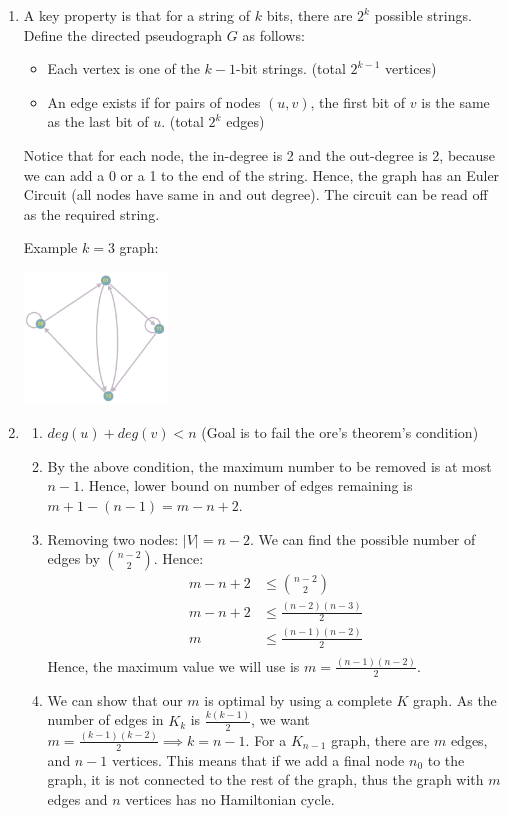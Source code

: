 \documentclass{article}
\begin{document}
\begin{enumerate}[label=(\alph*)]
    \item A key property is that for a string of $k$ bits, there are $2^k$ possible strings. Define the directed pseudograph $G$ as follows:
          \begin{itemize}
              \item Each vertex is one of the $k-1$-bit strings. (total $2^{k-1}$ vertices)
              \item An edge exists if for pairs of nodes $(u,v)$, the first bit of $v$ is the same as the last bit of $u$. (total $2^k$ edges)
          \end{itemize}
          Notice that for each node, the in-degree is 2 and the out-degree is 2, because we can add a 0 or a 1 to the end of the string. Hence, the graph has an Euler Circuit (all nodes have same in and out degree). The circuit can be read off as the required string.

          Example $k=3$ graph:

          \includegraphics[width=0.3\textwidth]{5-3-a.png}
    \item
          \begin{enumerate}[label=(\roman*)]
              \item $deg(u)+deg(v)< n$ (Goal is to fail the ore's theorem's condition)
              \item By the above condition, the maximum number to be removed is at most $n-1$. Hence, lower bound on number of edges remaining is $m+1 - (n-1) = m - n + 2$.
              \item Removing two nodes: $|V|=n-2$. We can find the possible number of edges by $\binom{n-2}{2}$. Hence:
                    \begin{align*}
                        m - n + 2 & \leq \binom{n-2}{2}       \\
                        m - n + 2 & \leq \frac{(n-2)(n-3)}{2} \\
                        m         & \leq \frac{(n-1)(n-2)}{2} \\
                    \end{align*}
                    Hence, the maximum value we will use is $m=\frac{(n-1)(n-2)}{2}$.
              \item We can show that our $m$ is optimal by using a complete $K$ graph. As the number of edges in $K_k$ is $\frac{k(k-1)}{2}$, we want $m=\frac{(k-1)(k-2)}{2} \implies k = n-1$. For a $K_{n-1}$ graph, there are $m$ edges, and $n-1$ vertices. This means that if we add a final node $n_0$ to the graph, it is not connected to the rest of the graph, thus the graph with $m$ edges and $n$ vertices has no Hamiltonian cycle.
          \end{enumerate}
\end{enumerate}
\end{document}
